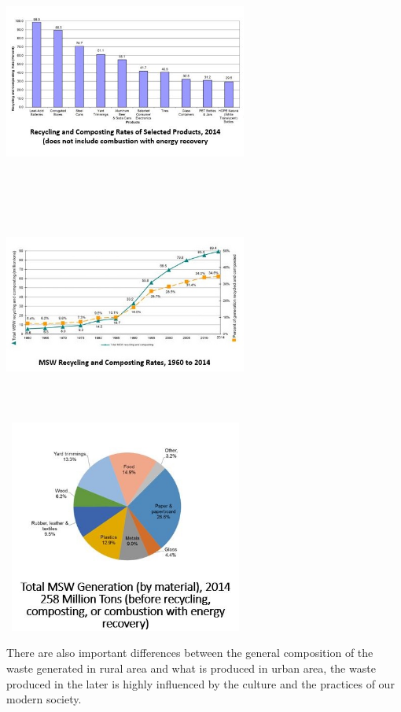 \documentclass[sigconf]{acmart}
\begin{document}
\includegraphics[width=8cm, height=7cm]{fig2.png}


\includegraphics[width=8cm, height=7cm]{fig3.jpg}


\includegraphics[width=8cm, height=7cm]{fig4.jpg}


There are also important differences between the general composition of the waste generated in rural area and what is produced in urban area, the waste produced in the later is highly influenced by the culture and the practices of our modern society.~\cite{chandrappa2012}
\end{document}
